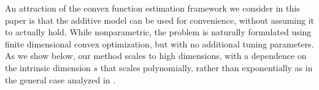 An attraction of the convex function estimation framework we consider
in this paper is that the additive model can be used for convenience,
without assuming it to actually hold.  While nonparametric, the
problem is naturally formulated using finite dimensional convex
optimization, but with no additional tuning parameters.  As we show
below, our method scales to high dimensions, with a dependence on the
intrinsic dimension $s$ that scales polynomially, rather than
exponentially as in the general case analyzed in \cite{dalalyan:12}.


%
%
%
%
%
%
%
%
